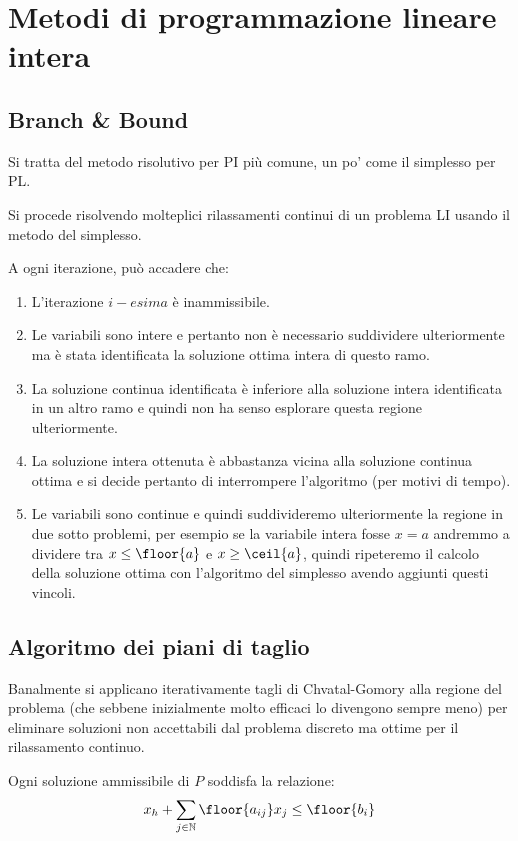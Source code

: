 \documentclass[\main/main.tex]{subfiles}
\begin{document}
\chapter{Metodi di programmazione lineare intera}

\section{Branch \& Bound}
Si tratta del metodo risolutivo per PI più comune, un po' come il simplesso per PL.

Si procede risolvendo molteplici rilassamenti continui di un problema LI usando il metodo del simplesso.

A ogni iterazione, può accadere che:

\begin{enumerate}
  \item L'iterazione $i-esima$ è inammissibile.
  \item Le variabili sono intere e pertanto non è necessario suddividere ulteriormente ma è stata identificata la soluzione ottima intera di questo ramo.
  \item La soluzione continua identificata è inferiore alla soluzione intera identificata in un altro ramo e quindi non ha senso esplorare questa regione ulteriormente.
  \item La soluzione intera ottenuta è abbastanza vicina alla soluzione continua ottima e si decide pertanto di interrompere l'algoritmo (per motivi di tempo).
  \item Le variabili sono continue e quindi suddivideremo ulteriormente la regione in due sotto problemi, per esempio se la variabile intera fosse $x = a$ andremmo a dividere tra $x \leq \floor{a}$ e $x \geq \ceil{a}$, quindi ripeteremo il calcolo della soluzione ottima con l'algoritmo del simplesso avendo aggiunti questi vincoli.
\end{enumerate}

\section{Algoritmo dei piani di taglio}
Banalmente si applicano iterativamente tagli di Chvatal-Gomory alla regione del problema (che sebbene inizialmente molto efficaci lo divengono sempre meno) per eliminare soluzioni non accettabili dal problema discreto ma ottime per il rilassamento continuo.

\begin{definition}
  Ogni soluzione ammissibile di $P$ soddisfa la relazione:
  \[
    x_h + \sum_{j \in \mathbb{N}} \floor{a_{ij}}x_j \leq \floor{b_i}
  \]
\end{definition}
\end{document}
